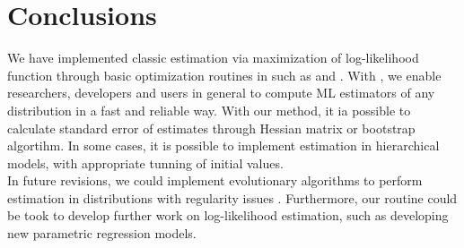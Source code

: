 \documentclass[nojss]{jss}
\begin{document}

\section{Conclusions} \label{sec:conclussions}

We have implemented classic estimation via maximization of log-likelihood function through basic optimization routines in  such as  and . With , we enable researchers, developers and users in general to compute ML estimators of any distribution in a fast and reliable way. With our  method, it ia possible to calculate standard error of estimates through Hessian matrix or bootstrap algortihm. In some cases, it is possible to implement estimation in hierarchical models, with appropriate tunning of initial values. \\

In future revisions, we could implement evolutionary algorithms to perform estimation in distributions with regularity issues \citep{Haupt2003}. Furthermore, our routine could be took to develop further work on log-likelihood estimation, such as developing new parametric regression models.




\newpage
\end{document}
